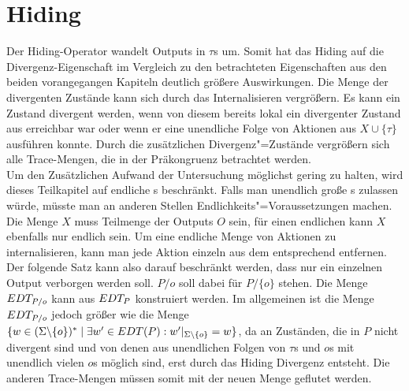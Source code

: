 \section{Hiding}

Der Hiding-Operator wandelt Outputs in $\tau$s um. Somit hat das Hiding auf die
Divergenz-Eigenschaft im Vergleich zu den betrachteten Eigenschaften aus den
beiden vorangegangen Kapiteln deutlich größere Auswirkungen. Die Menge der
divergenten Zustände kann sich durch das Internalisieren vergrößern. Es kann
ein Zustand divergent werden, wenn von diesem bereits lokal ein divergenter
Zustand aus erreichbar war oder wenn er eine unendliche Folge von Aktionen aus
$X\cup \{\tau\}$ ausführen konnte. Durch die zusätzlichen Divergenz"=Zustände
vergrößern sich alle Trace-Mengen, die in der Präkongruenz \DRel{} betrachtet
werden.\\
Um den Zusätzlichen Aufwand der Untersuchung möglichst gering zu halten, wird
dieses Teilkapitel auf endliche \MEIO{}s beschränkt. Falls man unendlich große
\MEIO{}s zulassen würde, müsste man an anderen Stellen
Endlichkeits"=Voraussetzungen machen.\\
Die Menge $X$ muss Teilmenge der Outputs $O$ sein, für einen endlichen \MEIO{}
kann $X$ ebenfalls nur endlich sein. Um eine endliche Menge von Aktionen zu
internalisieren, kann man jede Aktion einzeln aus dem entsprechend \MEIO{}
entfernen. Der folgende Satz kann also darauf beschränkt werden, dass nur ein
einzelnen Output verborgen werden soll. $P/o$ soll dabei für $P/\{o\}$ stehen.
Die Menge $EDT _{P/o}$ kann aus $EDT _P$ konstruiert werden. Im allgemeinen
ist die Menge $EDT _{P/o}$ jedoch größer wie die Menge $\{w\in
(\Sigma\backslash \{o\})^*\mid \exists w'\in EDT(P): w'|_{\Sigma\backslash
\{o\}} = w\}$, da an Zuständen, die in $P$ nicht divergent sind und von denen
aus unendlichen Folgen von $\tau$s und $o$s mit unendlich vielen $o$s möglich
sind, erst durch das Hiding Divergenz entsteht. Die anderen Trace-Mengen müssen
somit mit der neuen \EDT{} Menge geflutet werden.



